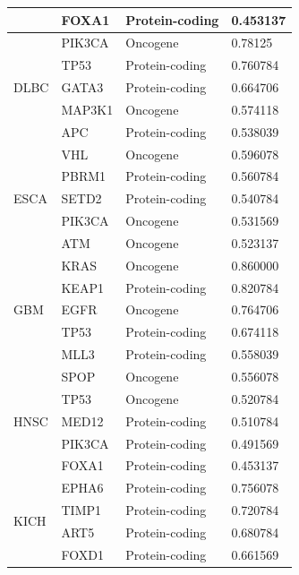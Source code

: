 \begin{table}
\begin{center}
{\begin{tabular}{l|l|l|l}
        & FOXA1 & Protein-coding & 0.453137 \\ %
        \midrule
        \multirow{5}{*}{DLBC} & PIK3CA & Oncogene & 0.78125 \\ %
        & TP53 & Protein-coding & 0.760784 \\ %
        & GATA3  & Protein-coding & 0.664706 \\ %
        & MAP3K1  & Oncogene & 0.574118 \\ %
        & APC   & Protein-coding & 0.538039 \\ 
        \midrule 
        \multirow{5}{*}{ESCA} & VHL & Oncogene & 0.596078 \\ %
        & PBRM1 & Protein-coding  & 0.560784 \\ %
        & SETD2 & Protein-coding & 0.540784 \\ %
        & PIK3CA & Oncogene & 0.531569 \\ %
        & ATM & Oncogene & 0.523137 \\ %
        \midrule
        \multirow{5}{*}{GBM}& KRAS & Oncogene & 0.860000 \\ %
        & KEAP1 & Protein-coding & 0.820784 \\ %
        & EGFR & Oncogene & 0.764706 \\ %
        & TP53 & Protein-coding & 0.674118 \\ %
        & MLL3 & Protein-coding & 0.558039 \\ %
        \midrule
        \multirow{5}{*}{HNSC}& SPOP & Oncogene & 0.556078 \\ %
        & TP53 & Oncogene & 0.520784 \\ %
        & MED12 & Protein-coding & 0.510784 \\ %
        & PIK3CA & Protein-coding & 0.491569 \\ %
        & FOXA1 & Protein-coding & 0.453137 \\ %
        \midrule
        \multirow{5}{*}{KICH}& EPHA6 & Protein-coding & 0.756078 \\ %
        & TIMP1 & Protein-coding & 0.720784 \\ %
        & ART5 & Protein-coding & 0.680784 \\ %
        & FOXD1 & Protein-coding & 0.661569 \\ %

\end{tabular}}
\end{center}
\end{table}
